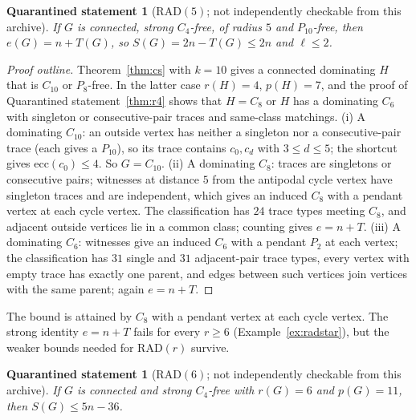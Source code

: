\documentclass[11pt]{amsart}
\newtheorem{qrecord}[theorem]{Quarantined statement}
\theoremstyle{definition}
\theoremstyle{remark}
\newcommand{\lr}{\ell}
\newcommand{\pp}{p}
\newcommand{\RAD}{\mathrm{RAD}}
\begin{document}
\begin{qrecord}[$\RAD(5)$; not independently checkable from this archive]\label{thm:rad5}
If $G$ is connected, strong $C_4$-free, of radius $5$ and $P_{10}$-free, then $e(G)=n+T(G)$, so $S(G)=2n-T(G)\le2n$ and $\lr\le2$.
\end{qrecord}

\begin{proof}[Proof outline]
Theorem~\ref{thm:cs} with $k=10$ gives a connected dominating $H$ that is $C_{10}$ or $P_8$-free. In the latter case $r(H)=4$, $\pp(H)=7$, and the proof of Quarantined statement~\ref{thm:r4} shows that $H=C_8$ or $H$ has a dominating $C_6$ with singleton or consecutive-pair traces and same-class matchings. (i) A dominating $C_{10}$: an outside vertex has neither a singleton nor a consecutive-pair trace (each gives a $P_{10}$), so its trace contains $c_0,c_d$ with $3\le d\le5$; the shortcut gives $\mathrm{ecc}(c_0)\le4$. So $G=C_{10}$. (ii) A dominating $C_8$: traces are singletons or consecutive pairs; witnesses at distance $5$ from the antipodal cycle vertex have singleton traces and are independent, which gives an induced $C_8$ with a pendant vertex at each cycle vertex. The classification has $24$ trace types meeting $C_8$, and adjacent outside vertices lie in a common class; counting gives $e=n+T$. (iii) A dominating $C_6$: witnesses give an induced $C_6$ with a pendant $P_2$ at each vertex; the classification has $31$ single and $31$ adjacent-pair trace types, every vertex with empty trace has exactly one parent, and edges between such vertices join vertices with the same parent; again $e=n+T$.
\end{proof}

The bound is attained by $C_8$ with a pendant vertex at each cycle vertex. The strong identity $e=n+T$ fails for every $r\ge6$ (Example~\ref{ex:radstar}), but the weaker bounds needed for $\RAD(r)$ survive.

\begin{qrecord}[$\RAD(6)$; not independently checkable from this archive]\label{thm:rad6}
If $G$ is connected and strong $C_4$-free with $r(G)=6$ and $\pp(G)=11$, then $S(G)\le5n-36$.
\end{qrecord}
\end{document}
